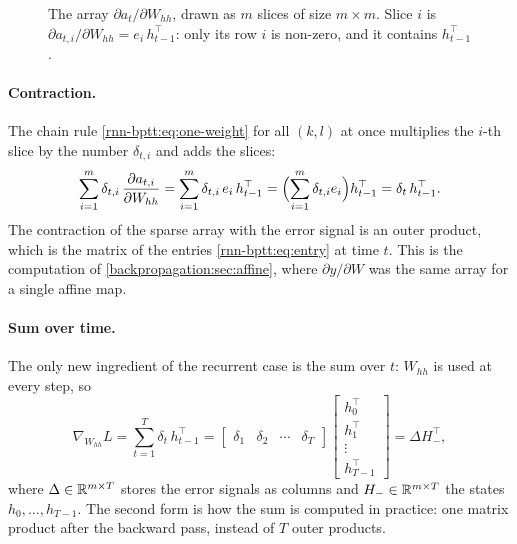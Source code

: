 \begin{notechapter}
\begin{figure}[ht]
\caption{The array $\partial a_t/\partial W_{hh}$, drawn as $m$ slices of size $m\times m$. Slice $i$ is
$\partial a_{t,i}/\partial W_{hh} = e_i\,h_{t-1}^\top$: only its row $i$ is non-zero, and it contains $h_{t-1}^\top$.}
\label{rnn-bptt:fig:slices}
\end{figure}

\paragraph{Contraction.} The chain rule \eqref{rnn-bptt:eq:one-weight} for all $(k,l)$ at once multiplies
the $i$-th slice by the number $\delta_{t,i}$ and adds the slices:
\[
  \sum_{i=1}^m\delta_{t,i}\,\frac{\partial a_{t,i}}{\partial W_{hh}} = \sum_{i=1}^m\delta_{t,i}\,e_i\,h_{t-1}^\top
  = \Bigl(\sum_{i=1}^m\delta_{t,i}e_i\Bigr)h_{t-1}^\top = \delta_t\,h_{t-1}^\top .
\]
The contraction of the sparse array with the error signal is an outer product, which is
the matrix of the entries \eqref{rnn-bptt:eq:entry} at time $t$. This is the computation of
\cref{backpropagation:sec:affine}, where $\partial y/\partial W$ was the same array for a single affine map.

\paragraph{Sum over time.} The only new ingredient of the recurrent case is the sum over
$t$: $W_{hh}$ is used at every step, so
\[
  \nabla_{W_{hh}}L = \sum_{t=1}^T\delta_t\,h_{t-1}^\top
  = \begin{bmatrix}\delta_1 & \delta_2 & \cdots & \delta_T\end{bmatrix}
    \begin{bmatrix}h_0^\top\\ h_1^\top\\ \vdots\\ h_{T-1}^\top\end{bmatrix} = \Delta H_{-}^\top ,
\]
where $\Delta\in\mathbb{R}^{m\times T}$ stores the error signals as columns and $H_-\in\mathbb{R}^{m\times T}$ the states $h_0,\dots,h_{T-1}$. The
second form is how the sum is computed in practice: one matrix product after the backward
pass, instead of $T$ outer products.


\end{notechapter}

